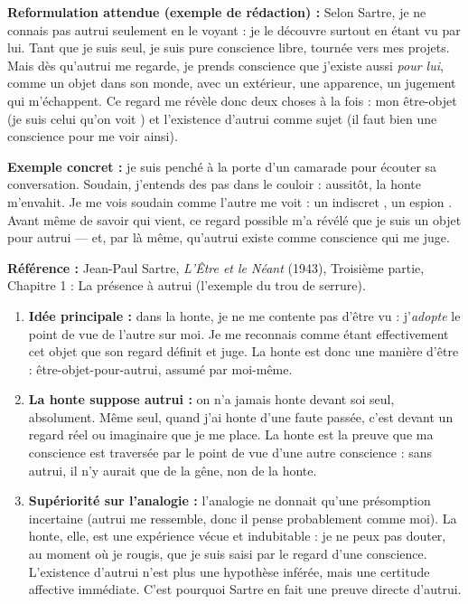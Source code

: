 \documentclass[11pt]{article}
\begin{document}
\begin{corrige}
\textbf{Reformulation attendue (exemple de rédaction) :} Selon Sartre, je ne connais pas autrui seulement en le voyant : je le découvre surtout en étant vu par lui. Tant que je suis seul, je suis pure conscience libre, tournée vers mes projets. Mais dès qu'autrui me regarde, je prends conscience que j'existe aussi \emph{pour lui}, comme un objet dans son monde, avec un extérieur, une apparence, un jugement qui m'échappent. Ce regard me révèle donc deux choses à la fois : mon être-objet (je suis \guillemotleft celui qu'on voit \guillemotright) et l'existence d'autrui comme sujet (il faut bien une conscience pour me voir ainsi).

\textbf{Exemple concret :} je suis penché à la porte d'un camarade pour écouter sa conversation. Soudain, j'entends des pas dans le couloir : aussitôt, la honte m'envahit. Je me vois soudain comme l'autre me voit : \guillemotleft un indiscret \guillemotright, \guillemotleft un espion \guillemotright. Avant même de savoir qui vient, ce regard possible m'a révélé que je suis un objet pour autrui — et, par là même, qu'autrui existe comme conscience qui me juge.
\end{corrige}

\begin{corrige}
\textbf{Référence :} Jean-Paul Sartre, \emph{L'Être et le Néant} (1943), Troisième partie, Chapitre 1 : \guillemotleft La présence à autrui \guillemotright (l'exemple du trou de serrure).
\begin{enumerate}
\item \textbf{Idée principale :} dans la honte, je ne me contente pas d'être vu : j'\emph{adopte} le point de vue de l'autre sur moi. Je me reconnais comme étant effectivement cet objet que son regard définit et juge. La honte est donc une manière d'être : être-objet-pour-autrui, assumé par moi-même.
\item \textbf{La honte suppose autrui :} on n'a jamais honte devant soi seul, absolument. Même seul, quand j'ai honte d'une faute passée, c'est devant un regard réel ou imaginaire que je me place. La honte est la preuve que ma conscience est traversée par le point de vue d'une autre conscience : sans autrui, il n'y aurait que de la gêne, non de la honte.
\item \textbf{Supériorité sur l'analogie :} l'analogie ne donnait qu'une présomption incertaine (autrui me ressemble, donc il pense probablement comme moi). La honte, elle, est une expérience vécue et indubitable : je ne peux pas douter, au moment où je rougis, que je suis saisi par le regard d'une conscience. L'existence d'autrui n'est plus une hypothèse inférée, mais une certitude affective immédiate. C'est pourquoi Sartre en fait une preuve directe d'autrui.
\end{enumerate}
\end{corrige}
\end{document}
